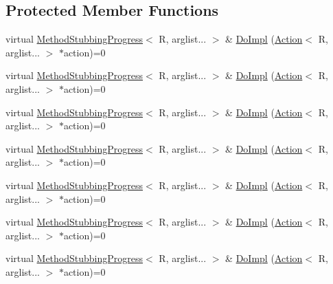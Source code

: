 \subsection*{Protected Member Functions}
\begin{DoxyCompactItemize}
\item 
virtual \mbox{\hyperlink{structfakeit_1_1MethodStubbingProgress}{Method\+Stubbing\+Progress}}$<$ R, arglist... $>$ \& \mbox{\hyperlink{structfakeit_1_1MethodStubbingProgress_a73218fd396f0096f93462f2d4656c509}{Do\+Impl}} (\mbox{\hyperlink{structfakeit_1_1Action}{Action}}$<$ R, arglist... $>$ $\ast$action)=0
\item 
virtual \mbox{\hyperlink{structfakeit_1_1MethodStubbingProgress}{Method\+Stubbing\+Progress}}$<$ R, arglist... $>$ \& \mbox{\hyperlink{structfakeit_1_1MethodStubbingProgress_a73218fd396f0096f93462f2d4656c509}{Do\+Impl}} (\mbox{\hyperlink{structfakeit_1_1Action}{Action}}$<$ R, arglist... $>$ $\ast$action)=0
\item 
virtual \mbox{\hyperlink{structfakeit_1_1MethodStubbingProgress}{Method\+Stubbing\+Progress}}$<$ R, arglist... $>$ \& \mbox{\hyperlink{structfakeit_1_1MethodStubbingProgress_a73218fd396f0096f93462f2d4656c509}{Do\+Impl}} (\mbox{\hyperlink{structfakeit_1_1Action}{Action}}$<$ R, arglist... $>$ $\ast$action)=0
\item 
virtual \mbox{\hyperlink{structfakeit_1_1MethodStubbingProgress}{Method\+Stubbing\+Progress}}$<$ R, arglist... $>$ \& \mbox{\hyperlink{structfakeit_1_1MethodStubbingProgress_a73218fd396f0096f93462f2d4656c509}{Do\+Impl}} (\mbox{\hyperlink{structfakeit_1_1Action}{Action}}$<$ R, arglist... $>$ $\ast$action)=0
\item 
virtual \mbox{\hyperlink{structfakeit_1_1MethodStubbingProgress}{Method\+Stubbing\+Progress}}$<$ R, arglist... $>$ \& \mbox{\hyperlink{structfakeit_1_1MethodStubbingProgress_a73218fd396f0096f93462f2d4656c509}{Do\+Impl}} (\mbox{\hyperlink{structfakeit_1_1Action}{Action}}$<$ R, arglist... $>$ $\ast$action)=0
\item 
virtual \mbox{\hyperlink{structfakeit_1_1MethodStubbingProgress}{Method\+Stubbing\+Progress}}$<$ R, arglist... $>$ \& \mbox{\hyperlink{structfakeit_1_1MethodStubbingProgress_a73218fd396f0096f93462f2d4656c509}{Do\+Impl}} (\mbox{\hyperlink{structfakeit_1_1Action}{Action}}$<$ R, arglist... $>$ $\ast$action)=0
\item 
virtual \mbox{\hyperlink{structfakeit_1_1MethodStubbingProgress}{Method\+Stubbing\+Progress}}$<$ R, arglist... $>$ \& \mbox{\hyperlink{structfakeit_1_1MethodStubbingProgress_a73218fd396f0096f93462f2d4656c509}{Do\+Impl}} (\mbox{\hyperlink{structfakeit_1_1Action}{Action}}$<$ R, arglist... $>$ $\ast$action)=0

\end{DoxyCompactItemize}
